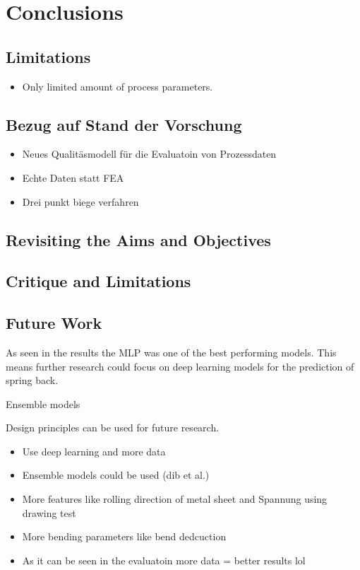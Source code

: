 \chapter{Conclusions}


\section{Limitations}

\begin{itemize}
    \item Only limited amount of process parameters.
\end{itemize}


\section{Bezug auf Stand der Vorschung}

\begin{itemize}
    \item Neues Qualitäsmodell für die Evaluatoin von Prozessdaten
    \item Echte Daten statt FEA
    \item Drei punkt biege verfahren
\end{itemize}


\section{Revisiting the Aims and Objectives}


\section{Critique and Limitations}


\section{Future Work}\label{sec:future-work}

As seen in the results the \ac{MLP} was one of the best performing models.
This means further research could focus on deep learning models for the prediction of
spring back.

Ensemble models

Design principles can be used for future research.


\begin{itemize}
    \item Use deep learning and more data
    \item Ensemble models could be used (dib et al.)
    \item More features like rolling direction of metal sheet and Spannung using
    drawing test
    \item More bending parameters like bend dedcuction
    \item As it can be seen in the evaluatoin more data = better results lol
\end{itemize}


